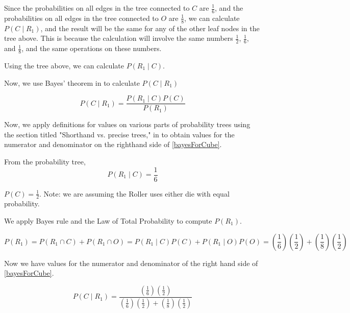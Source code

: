 \documentclass[a4paper,11pt]{article}
\begin{document}
Since the probabilities on all edges in the tree connected to $C$ are
$\frac{1}{6}$, and the probabilities on all edges in the tree connected
to $O$ are $\frac{1}{8}$, we can calculate 
$P \left( C \mid R_{1} \right)$, and the result will be the same for
any of the other leaf nodes in the tree above.  This is because the
calculation will involve the same numbers $\frac{1}{2}$, $\frac{1}{6}$,
and $\frac{1}{8}$, and the same operations on these numbers.

Using the tree above, we can calculate $P \left( R_{1} \mid C \right)$.

Now, we use Bayes' theorem in \cite{reading3} to calculate
$P \left( C \mid R_{1} \right)$

\begin{equation} \label{bayesForCube}
P \left( C \mid R_{1} \right) = 
  \frac{ P \left( R_{1} \mid C \right) P \left( C \right)}
    { P \left( R_{1} \right)}
\end{equation}

Now, we apply definitions for values on various parts of probability
trees using the section titled "Shorthand vs. precise trees," in 
\cite{reading3} to obtain values for the numerator and denominator on
the righthand side of \ref{bayesForCube}.

From the probability tree, 
\begin{equation}
P \left( R_{1} \mid C \right) = 
   \frac{1}{6}
\end{equation}

$P \left( C \right) = \frac{1}{2}$.  Note: we are assuming the Roller
uses either die with equal probability.

We apply Bayes rule \cite{reading3} and the Law of Total Probability
\cite{reading3} to compute $P \left( R_{1} \right)$.

\begin{equation}
  P \left( R_{1} \right)
    = P \left( R_{1} \cap C \right) + P \left( R_{1} \cap O \right)
    = P \left( R_{1} \mid C \right) P \left( C \right)
      + P \left( R_{1} \mid O \right) P \left( O \right)
    = \left( \frac{1}{6} \right)  \left( \frac{1}{2} \right)
      + \left( \frac{1}{8} \right)  \left( \frac{1}{2} \right)
\end{equation}

Now we have values for the numerator and denominator of the right
hand side of \ref{bayesForCube}.

\begin{equation}
P \left( C \mid R_{1} \right) = 
  \frac{ 
    \left( \frac{1}{6} \right) \left( \frac{1}{2} \right) 
    }
    {
      \left( \frac{1}{6} \right) \left( \frac{1}{2} \right) + 
        \left( \frac{1}{8} \right) \left( \frac{1}{2} \right) 
    }
\end{equation}


\printbibliography{}
\end{document}
